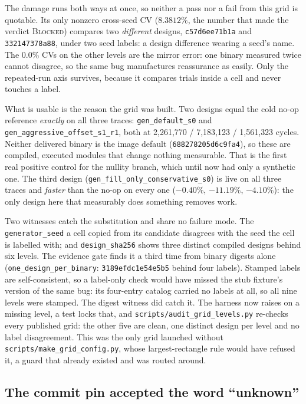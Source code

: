 \documentclass[10pt,twocolumn]{article}
\begin{document}
The damage runs both ways at once, so neither a pass nor a fail from this
grid is quotable. Its only nonzero cross-seed CV ($8.3812\%$, the number that made the
verdict \textsc{Blocked}) compares two \emph{different} designs, \texttt{c57d6ee71b1a}
and \texttt{332147378a88}, under two seed labels: a design difference wearing a seed's
name. The $0.0\%$ CVs on the other levels are the mirror error: one binary measured
twice cannot disagree, so the same bug manufactures reassurance as easily. Only the
repeated-run axis survives, because it compares trials inside a cell and never touches
a label.

What is usable is the reason the grid was built. Two designs equal the cold no-op
reference \emph{exactly} on all three traces: \texttt{gen\_default\_s0} and
\texttt{gen\_aggressive\_offset\_s1\_r1}, both at 2{,}261{,}770 / 7{,}183{,}123 /
1{,}561{,}323 cycles. Neither delivered binary is the image default
(\texttt{688278205d6c9fa4}), so these are compiled, executed modules that change
nothing measurable. That is the first real positive control for the nullity branch,
which until now had only a synthetic one. The third design
(\texttt{gen\_fill\_only\_conservative\_s0}) is live on all three traces and \emph{
faster} than the no-op on every one ($-0.40\%$, $-11.19\%$, $-4.10\%$): the only design
here that measurably does something removes work.

Two witnesses catch the substitution and share no failure mode. The
\texttt{generator\_seed} a cell copied from its candidate disagrees with the seed the
cell is labelled with; and \texttt{design\_sha256} shows three distinct compiled designs
behind six levels. The evidence gate finds it a third time from binary digests alone
(\texttt{one\_design\_per\_binary}: \texttt{3189efdc1e54e5b5} behind four labels).
Stamped labels are self-consistent, so a label-only check would have missed the stub
fixture's version of the same bug: its four-entry catalog carried no labels at all, so
all nine levels were stamped. The digest witness did catch it. The harness now
raises on a missing level, a test locks that, and
\texttt{scripts/audit\_grid\_levels.py} re-checks every published grid: the other five
are clean, one distinct design per level and no label disagreement. This was the only
grid launched without \texttt{scripts/make\_grid\_config.py}, whose largest-rectangle
rule would have refused it, a guard that already existed and was routed around.

\subsection{The commit pin accepted the word ``unknown''}
\label{sec:provenance}
\end{document}
